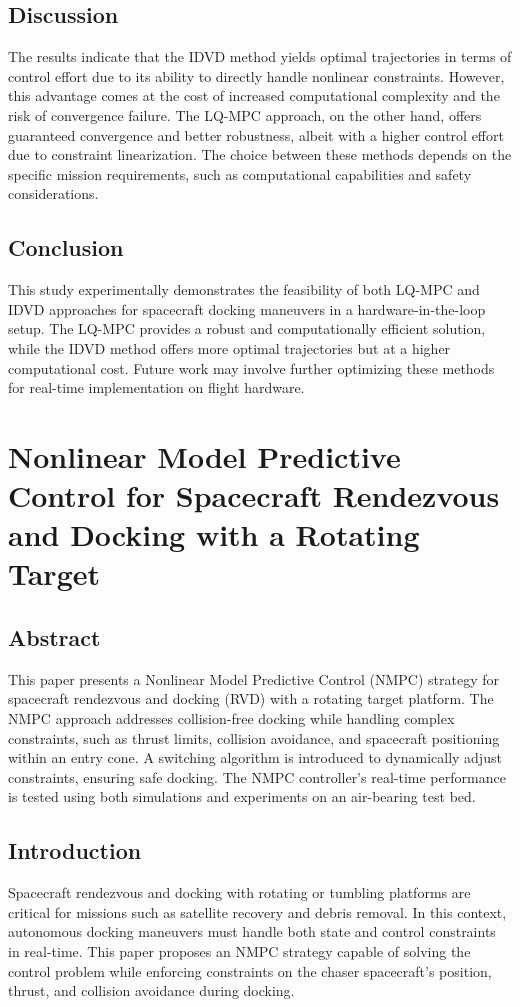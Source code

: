 \documentclass[a4paper,12pt]{article}
\begin{document}
    \subsection{Discussion}
        The results indicate that the IDVD method yields optimal trajectories in terms of control effort due to its ability to directly handle nonlinear constraints. However, this advantage comes at the cost of increased computational complexity and the risk of convergence failure. The LQ-MPC approach, on the other hand, offers guaranteed convergence and better robustness, albeit with a higher control effort due to constraint linearization. The choice between these methods depends on the specific mission requirements, such as computational capabilities and safety considerations.

        \subsection{Conclusion}
        This study experimentally demonstrates the feasibility of both LQ-MPC and IDVD approaches for spacecraft docking maneuvers in a hardware-in-the-loop setup. The LQ-MPC provides a robust and computationally efficient solution, while the IDVD method offers more optimal trajectories but at a higher computational cost. Future work may involve further optimizing these methods for real-time implementation on flight hardware.

\section{Nonlinear Model Predictive Control for Spacecraft Rendezvous and Docking with a Rotating Target}
        \subsection{Abstract}
        This paper presents a Nonlinear Model Predictive Control (NMPC) strategy for spacecraft rendezvous and docking (RVD) with a rotating target platform. The NMPC approach addresses collision-free docking while handling complex constraints, such as thrust limits, collision avoidance, and spacecraft positioning within an entry cone. A switching algorithm is introduced to dynamically adjust constraints, ensuring safe docking. The NMPC controller's real-time performance is tested using both simulations and experiments on an air-bearing test bed.
        
        \subsection{Introduction}
        Spacecraft rendezvous and docking with rotating or tumbling platforms are critical for missions such as satellite recovery and debris removal. In this context, autonomous docking maneuvers must handle both state and control constraints in real-time. This paper proposes an NMPC strategy capable of solving the control problem while enforcing constraints on the chaser spacecraft's position, thrust, and collision avoidance during docking.
        
\end{document}
